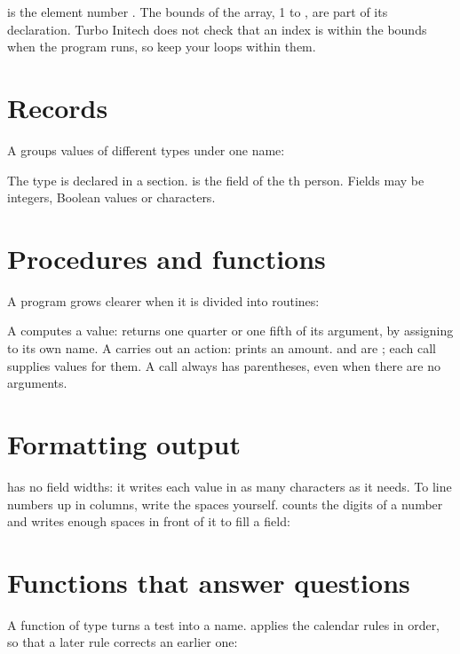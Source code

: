 

 is the element number .  The bounds of the array,
1 to , are part of its declaration.  Turbo Initech does not
check that an index is within the bounds when the program runs, so keep
your loops within them.

\section{Records}
A  groups values of different types under one name:



The type  is declared in a  section.  
is the field  of the th person.  Fields may be integers,
Boolean values or characters.

\section{Procedures and functions}
A program grows clearer when it is divided into routines:



A  computes a value:  returns one quarter or
one fifth of its argument, by assigning to its own name.  A
 carries out an action:  prints an amount.
 and  are ; each call supplies values for
them.  A call always has parentheses, even when there are no arguments.

\section{Formatting output}
 has no field widths: it writes each value in as many
characters as it needs.  To line numbers up in columns, write the spaces
yourself.   counts the digits of a number and writes enough
spaces in front of it to fill a field:



\section{Functions that answer questions}
A function of type  turns a test into a name.  
applies the calendar rules in order, so that a later rule corrects an
earlier one:

